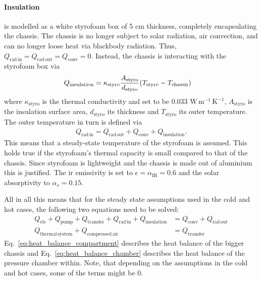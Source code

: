 \documentclass[
  a4paper,
  11pt,
  openany,
  parskip,
  toc=totoc,
  listof=totoc,
  bibliography=totoc
]{scrreprt}
\renewcommand{\eqref}[1]{Eq.~\textup{\ref{#1}}}
\let\qty\relax
\newcommand{\qty}[1]{\left( #1 \right)}
\newcommand{\qc}{\quad}
\begin{document}
\paragraph{Insulation} is modelled as a white styrofoam box of 5 cm thickness, completely encapsulating the chassis. The chassis is no longer subject to solar radiation, air convection, and can no longer loose heat via blackbody radiation. Thus, $Q_\mathrm{rad\,in}=Q_\mathrm{rad\,out}=Q_\mathrm{conv}=0$. Instead, the chassis is interacting with the styrofoam box via 
\begin{align}
    Q_\mathrm{insulation}=\kappa_\mathrm{styro}\frac{A_\mathrm{styro}}{d_\mathrm{styro}}\qty(T_\mathrm{styro}-T_\mathrm{chassis})\qc
\end{align} 
where $\kappa_\mathrm{styro}$ is the thermal conductivity and set to be 0.033 $\mathrm{W\,m^{-1}\,K^{-1}}$, $A_\mathrm{styro}$ is the insulation surface area, $d_\mathrm{styro}$ its thickness and $T_\mathrm{styro}$ its outer temperature. The outer temperature in turn is defined via 
\begin{align}
    Q_\mathrm{rad\,in} = Q_\mathrm{rad\,out}+Q_\mathrm{conv} + Q_\mathrm{insulation}.
\end{align}
This means that a steady-state temperature of the styrofoam is assumed. This holds true if the styrofoam's thermal capacity is small compared to that of the chassis. Since styrofoam is lightweight and the chassis is made out of aluminium this is justified.
The \gls{ir} emissivity is set to $\epsilon=\alpha_\mathrm{IR}=0.6$ and the solar absorptivity to $\alpha_s=0.15$.\par 

All in all this means that for the steady state assumptions used in the cold and hot cases, the following two equations need to be solved:
\begin{align}
    Q_\mathrm{ele}+Q_\mathrm{pump}+Q_\mathrm{transfer} + Q_\mathrm{rad\,in} + Q_\mathrm{insulation} &= Q_\mathrm{conv} + Q_\mathrm{rad\,out} \label{eq:heat_balance_compartment}\\ 
    Q_\mathrm{thermal\,system}+Q_\mathrm{compressed\,air} &=  Q_\mathrm{transfer} \label{eq:heat_balance_chamber}
\end{align} 
\eqref{eq:heat_balance_compartment} describes the heat balance of the bigger chassis and \eqref{eq:heat_balance_chamber} describes the heat balance of the pressure chamber within. Note, that depending on the assumptions in the cold and hot cases, some of the terms might be 0.%
\end{document}

